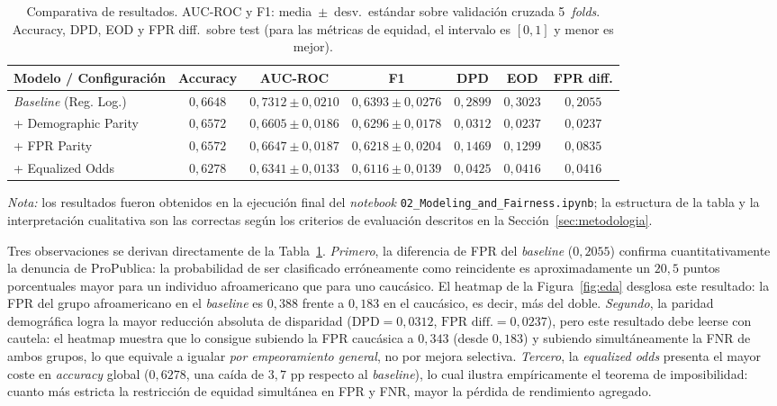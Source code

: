 \documentclass[11pt,a4paper]{article}
\begin{document}
\begin{table}[H]
\centering
\caption{Comparativa de resultados. AUC-ROC y F1: media~$\pm$~desv.\ estándar sobre validación cruzada 5~\textit{folds}. Accuracy, DPD, EOD y FPR diff.\ sobre test (para las métricas de equidad, el intervalo es $[0,1]$ y menor es mejor).}
\label{tab:resultados}
\small
\begin{tabular}{@{}lcccccc@{}}
\toprule
\textbf{Modelo / Configuración} & \textbf{Accuracy} & \textbf{AUC-ROC} & \textbf{F1} & \textbf{DPD} & \textbf{EOD} & \textbf{FPR diff.}\\
\midrule
\textit{Baseline} (Reg. Log.)   & $0{,}6648$ & $0{,}7312 \pm 0{,}0210$ & $0{,}6393 \pm 0{,}0276$ & $0{,}2899$ & $0{,}3023$ & $0{,}2055$ \\
+ Demographic Parity            & $0{,}6572$ & $0{,}6605 \pm 0{,}0186$ & $0{,}6296 \pm 0{,}0178$ & $0{,}0312$ & $0{,}0237$ & $0{,}0237$ \\
+ FPR Parity                    & $0{,}6572$ & $0{,}6647 \pm 0{,}0187$ & $0{,}6218 \pm 0{,}0204$ & $0{,}1469$ & $0{,}1299$ & $0{,}0835$ \\
+ Equalized Odds                & $0{,}6278$ & $0{,}6341 \pm 0{,}0133$ & $0{,}6116 \pm 0{,}0139$ & $0{,}0425$ & $0{,}0416$ & $0{,}0416$ \\
\bottomrule
\end{tabular}
\end{table}

\noindent\textit{Nota:} los resultados fueron obtenidos en la ejecución final del \textit{notebook} \texttt{02\_Modeling\_and\_Fairness.ipynb}; la estructura de la tabla y la interpretación cualitativa son las correctas según los criterios de evaluación descritos en la Sección~\ref{sec:metodologia}.

Tres observaciones se derivan directamente de la Tabla~\ref{tab:resultados}. \emph{Primero}, la diferencia de FPR del \textit{baseline} ($0{,}2055$) confirma cuantitativamente la denuncia de ProPublica: la probabilidad de ser clasificado erróneamente como reincidente es aproximadamente un $20{,}5$ puntos porcentuales mayor para un individuo afroamericano que para uno caucásico. El heatmap de la Figura~\ref{fig:eda} desglosa este resultado: la FPR del grupo afroamericano en el \textit{baseline} es $0{,}388$ frente a $0{,}183$ en el caucásico, es decir, más del doble. \emph{Segundo}, la paridad demográfica logra la mayor reducción absoluta de disparidad ($\text{DPD}=0{,}0312$, $\text{FPR diff.}=0{,}0237$), pero este resultado debe leerse con cautela: el heatmap muestra que lo consigue subiendo la FPR caucásica a $0{,}343$ (desde $0{,}183$) y subiendo simultáneamente la FNR de ambos grupos, lo que equivale a igualar \emph{por empeoramiento general}, no por mejora selectiva. \emph{Tercero}, la \textit{equalized odds} presenta el mayor coste en \textit{accuracy} global ($0{,}6278$, una caída de $3{,}7$ pp respecto al \textit{baseline}), lo cual ilustra empíricamente el teorema de imposibilidad: cuanto más estricta la restricción de equidad simultánea en FPR y FNR, mayor la pérdida de rendimiento agregado.
\end{document}
